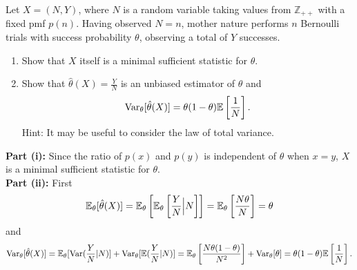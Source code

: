 \documentclass{article}
\begin{document}
\MakeAssignmentTitle

\begin{homeworkProblem}
  Let $X = (N, Y)$, where $N$ is a random variable taking values from $\mathbb{Z}_{++}$ with a fixed pmf $p(n)$. Having observed
  $N=n$, mother nature performs $n$ Bernoulli trials with success probability $\theta$, observing a total of $Y$ successes.
  \begin{enumerate}[label=\roman*), topsep=5pt, itemsep=5pt]
    \item Show that $X$ itself is a minimal sufficient statistic for $\theta$.
    \item Show that $\hat{\theta}(X) = \frac{Y}{N}$ is an unbiased estimator of $\theta$ and
          \[
            \operatorname{Var}_\theta[\hat{\theta}(X)] = \theta(1-\theta)\mathbb{E} \left[\frac{1}{N}\right].
          \]
          Hint: It may be useful to consider the law of total variance. \\
  \end{enumerate}

  \solution

  \textbf{Part (i):} Since the ratio of $p(x)$ and $p(y)$ is independent of $\theta$ when $x=y$, $X$ is a minimal sufficient statistic for $\theta$. \\

  \textbf{Part (ii):} First
  \[
    \mathbb{E}_\theta[\hat{\theta}(X)] = \mathbb{E}_\theta\left[\mathbb{E}_\theta\left[\frac{Y}{N}\Big|N\right]\right] = \mathbb{E}_\theta\left[\frac{N\theta}{N}\right] = \theta
  \]
  and
  \[
    \operatorname{Var}_\theta[\hat{\theta}(X)] = \mathbb{E}_\theta[\operatorname{Var}(\frac{Y}{N}|N)] + \operatorname{Var}_\theta[\mathbb{E}(\frac{Y}{N}|N)] = \mathbb{E}_\theta\left[\frac{N\theta(1-\theta)}{N^2}\right] + \operatorname{Var}_\theta[\theta] = \theta(1-\theta)\mathbb{E} \left[\frac{1}{N}\right].
  \]
\end{homeworkProblem}
\end{document}
